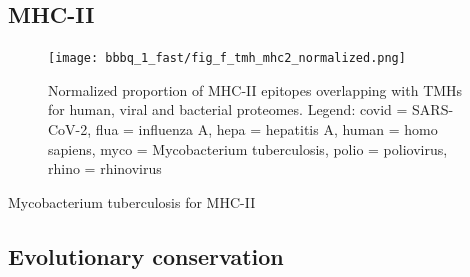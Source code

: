 %   

\subsection{MHC-II}

\begin{figure}[!htbp]
  \texttt{[image: bbbq\_1\_fast/fig\_f\_tmh\_mhc2\_normalized.png]}
  \caption{
    Normalized proportion of MHC-II epitopes overlapping with TMHs
    for human, viral and bacterial proteomes.
    Legend: covid = SARS-CoV-2, flua = influenza A, hepa = hepatitis A,
    human = homo sapiens, myco = Mycobacterium tuberculosis, 
    polio = poliovirus, rhino = rhinovirus
  }
  \label{fig:f_tmh_mhc2_normalized}
\end{figure}

  

%   

%   
      Mycobacterium tuberculosis for MHC-II

\subsection{Evolutionary conservation}

